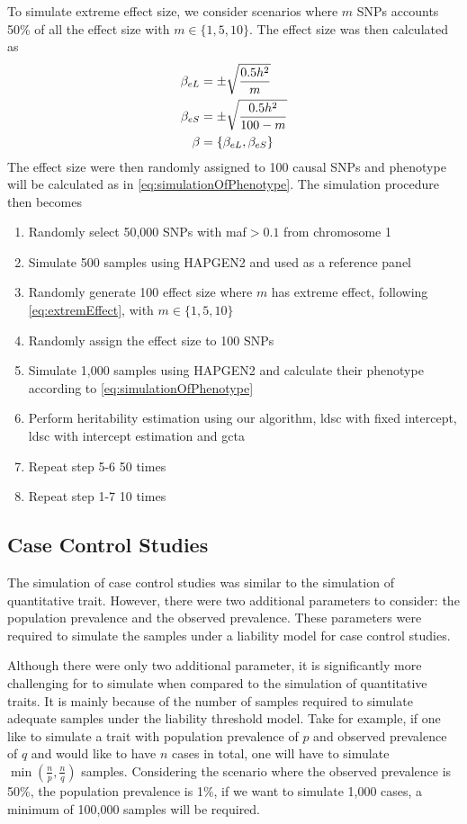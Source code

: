 		To simulate extreme effect size, we consider scenarios where $m$ \glspl{SNP} accounts 50\% of all the effect size with $m\in\{1,5,10\}$.
		The effect size was then calculated as
		\begin{align}
		\beta_{eL} &= \pm\sqrt{\frac{0.5h^2}{m}} \notag\\
		\beta_{eS} &= \pm\sqrt{\frac{0.5h^2}{100-m}} \notag\\
		\beta &= \{\beta_{eL}, \beta_{eS}\}
		\label{eq:extremEffect}
		\end{align}
		The effect size were then randomly assigned to 100 causal \glspl{SNP} and phenotype will be calculated as in \cref{eq:simulationOfPhenotype}.
		The simulation procedure then becomes
		\begin{enumerate}
			\item Randomly select 50,000 \glspl{SNP} with \gls{maf}$>0.1$ from chromosome 1
			\item Simulate 500 samples using HAPGEN2 and used as a reference panel
			\item Randomly generate 100 effect size where $m$ has extreme effect, following \cref{eq:extremEffect}, with $m\in\{1,5,10\}$
			\item Randomly assign the effect size to 100 \glspl{SNP}
			\item Simulate 1,000 samples using HAPGEN2 and calculate their phenotype according to \cref{eq:simulationOfPhenotype}
			\item Perform heritability estimation using our algorithm, \gls{ldsc} with fixed intercept, \gls{ldsc} with intercept estimation and \gls{gcta}
			\item Repeat step 5-6 50 times
			\item Repeat step 1-7 10 times
		\end{enumerate}
		
		\subsection{Case Control Studies}
		The simulation of case control studies was similar to the simulation of quantitative trait. 
		However, there were two additional parameters to consider: the population prevalence and the observed prevalence.
		These parameters were required to simulate the samples under a liability model for case control studies.

		Although there were only two additional parameter, it is significantly more challenging for to simulate when compared to the simulation of quantitative traits.
		It is mainly because of the number of samples required to simulate adequate samples under the liability threshold model.
		Take for example, if one like to simulate a trait with population prevalence of $p$ and observed prevalence of $q$ and would like to have $n$ cases in total, one will have to simulate $\min(\frac{n}{p}, \frac{n}{q})$ samples.
		Considering the scenario where the observed prevalence is 50\%, the population prevalence is 1\%, if we want to simulate 1,000 cases, a minimum of 100,000 samples will be required.
		
